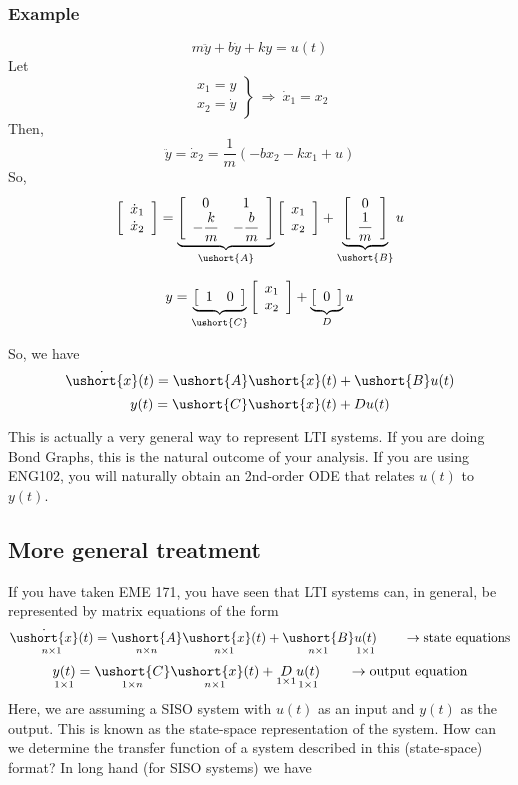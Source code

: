 \documentclass{book}
\def\ubar#1{\ushort{#1}}
\newcommand{\exmp}{\subsubsection*{Example}}
\begin{document}
\exmp
\[ m\ddot{y} + b\dot{y} + ky = u(t) \]
Let
\[ \left.\begin{array}{c} x_1=y \\ 
x_2 = \dot{y} \end{array}\right\}\ \Rightarrow\ \dot{x}_1 = x_2 \]
Then,
\[ \ddot{y}=\dot{x}_2 = \frac{1}{m}(-bx_2-kx_1+u)  \]
So,
\[ \left[\begin{array}{c}\dot{x}_1\\\dot{x}_2\end{array}\right] = \underbrace{\left[\begin{array}{c c}0 & 1\\-\dfrac{k}{m}&-\dfrac{b}{m}\end{array}\right]}_{\ubar{A}} \left[\begin{array}{c}x_1\\x_2\end{array}\right] + \underbrace{\left[\begin{array}{c}0\\\dfrac{1}{m}\end{array}\right]}_{\ubar{B}} u \]

\[ y = \underbrace{\left[\begin{array}{c c}1 & 0\end{array}\right]}_{\ubar{C}} \left[\begin{array}{c}x_1\\x_2\end{array}\right] + \underbrace{\left[\begin{array}{c}0\end{array}\right]}_{D}u \]

So, we have
\[ \dot{\ubar{x}}(t) = \ubar{A}\ubar{x}(t) + \ubar{B}u(t) \]
\[ y(t) = \ubar{C}\ubar{x}(t)+Du(t) \]

This is actually a very general way to represent LTI systems. If you are doing Bond Graphs, this is the natural outcome of your analysis. If you are using ENG102, you will naturally obtain an 2nd-order ODE that relates $ u(t) $ to $ y(t) $.

\subsection*{More general treatment}
If you have taken EME 171, you have seen that LTI systems can, in general, be represented by matrix equations of the form
\[ \underset{n\times1}{\dot{\ubar{x}}(t)} = \underset{n\times n}{\ubar{A}}\underset{n\times1}{\ubar{x}(t)} + \underset{n\times 1}{\ubar{B}}\underset{1\times1}{u(t)} \qquad \to\text{state equations} \]
\[ \underset{1\times1}{y(t)} = \underset{1\times n}{\ubar{C}}\underset{n\times1}{\ubar{x}(t)}+\underset{1\times1}{D}\underset{1\times1}{u(t)} \qquad \to\text{output equation} \]
Here, we are assuming a SISO system with $ u(t) $ as an input and $ y(t) $ as the output. This is known as the state-space representation of the system. How can we determine the transfer function of a system described in this (state-space) format? In long hand (for SISO systems) we have
\end{document}
